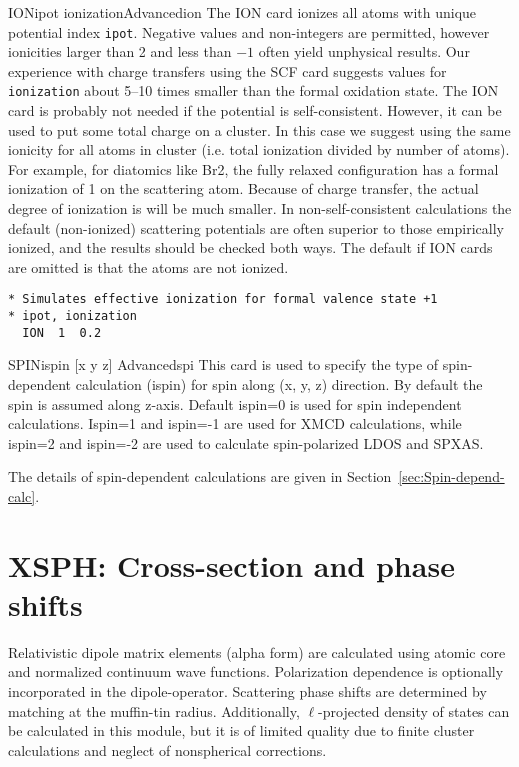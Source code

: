 \documentclass[11pt,oneside]{report} %
\begin{document}
\begin{Card}{ION}{ipot ionization}{Advanced}{ion}
  The ION card ionizes all atoms with unique potential index
  \texttt{ipot}.  Negative values and non-integers are permitted,
  however ionicities larger than 2 and less than $-1$ often yield
  unphysical results.  Our experience with charge transfers using the
  SCF card suggests values for \texttt{ionization} about 5--10 times
  smaller than the formal oxidation state.  The ION card is probably
  not needed if the potential is self-consistent.  However, it can be
  used to put some total charge on a cluster. In this case we suggest
  using the same ionicity for all atoms in cluster (i.e. total
  ionization divided by number of atoms).  For example, for diatomics
  like Br2, the fully relaxed configuration has a formal ionization of
  1 on the scattering atom.  Because of charge transfer, the actual
  degree of ionization is will be much smaller. In non-self-consistent
  calculations the default (non-ionized) scattering potentials are
  often superior to those empirically ionized, and the results should
  be checked both ways.  The default if ION cards are omitted is that
  the atoms are not ionized.
\begin{verbatim}
* Simulates effective ionization for formal valence state +1
* ipot, ionization
  ION  1  0.2
\end{verbatim}
\end{Card}



\begin{Card}{SPIN}{ispin [x  y  z] }{Advanced}{spi}
  This card is used to specify the type of spin-dependent calculation
  (ispin) for spin along (x, y, z) direction. By default the 
  spin is assumed along z-axis. Default ispin=0 is used for spin
  independent calculations. Ispin=1 and ispin=-1 are used for
  XMCD calculations, while ispin=2 and ispin=-2 are used to calculate
  spin-polarized LDOS and SPXAS. 

  The details of spin-dependent calculations are given in
  Section~\ref{sec:Spin-depend-calc}.
\end{Card}



\section{XSPH: Cross-section and phase shifts}
\label{sec:Cross-section-phase}


Relativistic dipole matrix elements (alpha form) are calculated using
atomic core and normalized continuum wave functions.  Polarization
dependence is optionally incorporated in the dipole-operator.
Scattering phase shifts are determined by matching at the muffin-tin
radius.  Additionally, $\ell$-projected density of states can be
calculated in this module, but it is of limited quality due to finite
cluster calculations and neglect of nonspherical corrections.
\end{document}
